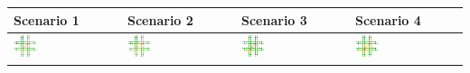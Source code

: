 \begin{table}[b]
	\centering
	\renewcommand{\arraystretch}{1.3}
	\begin{tabularx}{\textwidth}{|Y|Y|Y|Y|}
		\hline
		
		\textbf{Scenario 1} & \textbf{Scenario 2} & \textbf{Scenario 3} & \textbf{Scenario 4} \\
		
		\hline
		
		\includegraphics[width=0.23\textwidth, trim=0 0 0 -3]{../gfx/data/E1_003.png} &
		\includegraphics[width=0.23\textwidth, trim=0 0 0 -3]{../gfx/data/E2_003.png} &
		\includegraphics[width=0.23\textwidth, trim=0 0 0 -3]{../gfx/data/E3_003.png} &
		\includegraphics[width=0.23\textwidth, trim=0 0 0 -3]{../gfx/data/E4_003.png} \\
		
		\hline
		

\end{tabularx}
\end{table}
